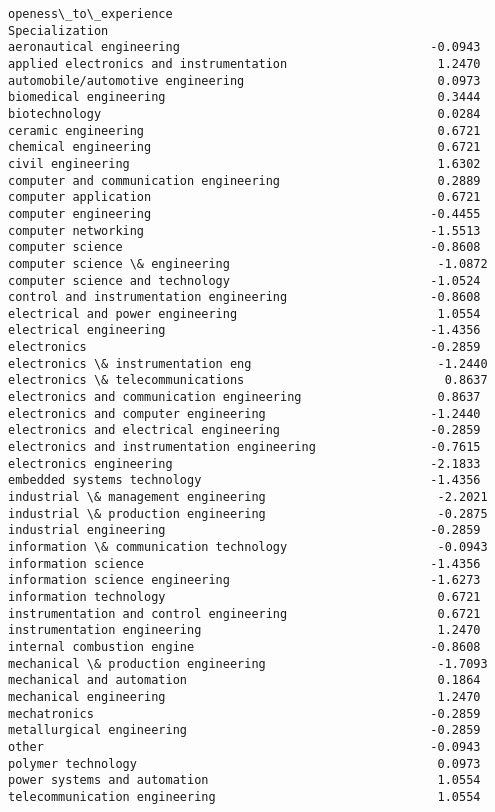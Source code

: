 \documentclass[11pt]{article}
\begin{document}
\begin{tcolorbox}[breakable, size=fbox, boxrule=.5pt, pad at break*=1mm, opacityfill=0]
\begin{Verbatim}[commandchars=\\\{\}]
                                             openess\_to\_experience
Specialization
aeronautical engineering                                   -0.0943
applied electronics and instrumentation                     1.2470
automobile/automotive engineering                           0.0973
biomedical engineering                                      0.3444
biotechnology                                               0.0284
ceramic engineering                                         0.6721
chemical engineering                                        0.6721
civil engineering                                           1.6302
computer and communication engineering                      0.2889
computer application                                        0.6721
computer engineering                                       -0.4455
computer networking                                        -1.5513
computer science                                           -0.8608
computer science \& engineering                             -1.0872
computer science and technology                            -1.0524
control and instrumentation engineering                    -0.8608
electrical and power engineering                            1.0554
electrical engineering                                     -1.4356
electronics                                                -0.2859
electronics \& instrumentation eng                          -1.2440
electronics \& telecommunications                            0.8637
electronics and communication engineering                   0.8637
electronics and computer engineering                       -1.2440
electronics and electrical engineering                     -0.2859
electronics and instrumentation engineering                -0.7615
electronics engineering                                    -2.1833
embedded systems technology                                -1.4356
industrial \& management engineering                        -2.2021
industrial \& production engineering                        -0.2875
industrial engineering                                     -0.2859
information \& communication technology                     -0.0943
information science                                        -1.4356
information science engineering                            -1.6273
information technology                                      0.6721
instrumentation and control engineering                     0.6721
instrumentation engineering                                 1.2470
internal combustion engine                                 -0.8608
mechanical \& production engineering                        -1.7093
mechanical and automation                                   0.1864
mechanical engineering                                      1.2470
mechatronics                                               -0.2859
metallurgical engineering                                  -0.2859
other                                                      -0.0943
polymer technology                                          0.0973
power systems and automation                                1.0554
telecommunication engineering                               1.0554


\end{Verbatim}
\end{tcolorbox}
\end{document}
